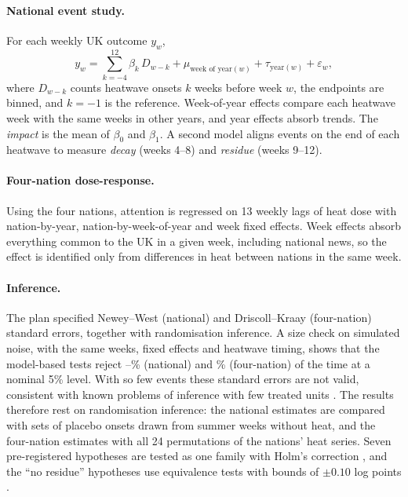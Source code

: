 \documentclass[11pt,a4paper]{article}
\begin{document}
\paragraph{National event study.} For each weekly UK outcome $y_w$,
\begin{equation}
y_w = \sum_{k=-4}^{12} \beta_k\, D_{w-k} + \mu_{\text{week of year}(w)} + \tau_{\text{year}(w)} + \varepsilon_w ,
\end{equation}
where $D_{w-k}$ counts heatwave onsets $k$ weeks before week $w$, the endpoints are binned, and $k=-1$ is the reference. Week-of-year effects compare each heatwave week with the same weeks in other years, and year effects absorb trends. The \emph{impact} is the mean of $\beta_0$ and $\beta_1$. A second model aligns events on the end of each heatwave to measure \emph{decay} (weeks 4--8) and \emph{residue} (weeks 9--12).

\paragraph{Four-nation dose-response.} Using the four nations, attention is regressed on 13 weekly lags of heat dose with nation-by-year, nation-by-week-of-year and week fixed effects. Week effects absorb everything common to the UK in a given week, including national news, so the effect is identified only from differences in heat between nations in the same week.

\paragraph{Inference.} The plan specified Newey--West (national) and Driscoll--Kraay (four-nation) standard errors, together with randomisation inference. A size check on simulated noise, with the same weeks, fixed effects and heatwave timing, shows that the model-based tests reject \SizeAOneMin--\SizeAOneMax\% (national) and \SizeATwo\% (four-nation) of the time at a nominal 5\% level. With so few events these standard errors are not valid, consistent with known problems of inference with few treated units \citep{conley2011,young2019}. The results therefore rest on randomisation inference: the national estimates are compared with \NDraws{} sets of placebo onsets drawn from summer weeks without heat, and the four-nation estimates with all 24 permutations of the nations' heat series. Seven pre-registered hypotheses are tested as one family with Holm's correction \citep{holm1979}, and the ``no residue'' hypotheses use equivalence tests with bounds of $\pm 0.10$ log points \citep{lakens2017}.
\end{document}
